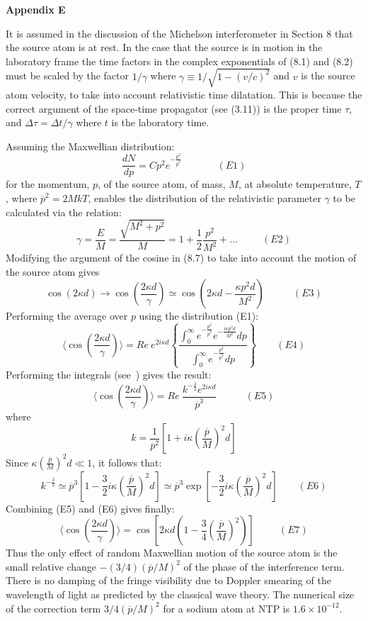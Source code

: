 { \newpage
  {\bf Appendix E}
  \par It is assumed in the discussion of the Michelson interferometer in Section 8 that the source atom
  is at rest. In the case that the source is in motion in the laboratory frame the time
   factors in the complex exponentials of (8.1) and (8.2) must be scaled by the factor $1/\gamma$
 where $\gamma \equiv 1/\sqrt{1-(v/c)^2}$ and $v$ is the source atom velocity, to take into
  account relativistic time dilatation. This is because the correct argument of the space-time
  propagator (see (3.11)) is the proper time $\tau$, and $\Delta \tau = \Delta t/\gamma$
  where $t$ is the laboratory time.
  \par Assuming the Maxwellian distribution:
  \[ \frac{dN}{dp} = Cp^2 e^{-\frac{p^2}{\overline{p}^2}} ~~~~~~~~~~~~~~~~(E1)\]
  for the momentum, $p$, of the source atom, of mass, $M$, at absolute temperature, $T$,
   where $\overline{p}^2 = 2MkT$,
   enables the distribution of the
  relativistic parameter $\gamma$ to be calculated via the relation:
  \[ \gamma = \frac{E}{M} = \frac{\sqrt{M^2+p^2}}{M} = 1+ \frac{1}{2} \frac{p^2}{M^2}+ ...~~~~~~~~~~~(E2)\]
  Modifying the argument of the cosine in
   (8.7) to take into account the motion of the source atom gives
\[ \cos(2 \kappa d) \rightarrow  \cos(\frac{2 \kappa d}{\gamma}) \simeq  \cos(2 \kappa d- \frac{\kappa p^2 d}{M^2})
   ~~~~~~~~~~~~~(E3) \]
 Performing the average over $p$ using the distribution (E1):
 \[ \langle  \cos(\frac{2 \kappa d}{\gamma}) \rangle = Re~ e^{2i \kappa d} \left\{
  \frac{\int_0^{\infty} e^{-\frac{p^2}{\overline{p}^2}}  e^{-\frac{i \kappa  p^2 d}{M^2}} dp}
    {\int_0^{\infty}  e^{-\frac{p^2}{\overline{p}^2}} dp} \right\}~~~~~~~~~(E4) \]  
 Performing the integrals (see~\cite{Jeans}) gives the result:
  \[ \langle  \cos(\frac{2 \kappa d}{\gamma}) \rangle = Re~\frac{k^{-\frac{3}{2}} e^{2 i \kappa d}}
    {\overline{p}^3}~~~~~~~~~~~~~(E5) \]
  where 
  \[ k = \frac{1}{\overline{p}^2}[1+ i \kappa\left(\frac{\overline{p}}{M}\right)^2 d] \]
  Since $\kappa\left(\frac{\overline{p}}{M}\right)^2 d \ll 1$, it follows that:
 \[ k^{-\frac{3}{2}} \simeq \overline{p}^3[1-\frac{3}{2}i \kappa\left(\frac{\overline{p}}{M}\right)^2 d]
  \simeq   \overline{p}^3 \exp\left[-\frac{3}{2}i \kappa\left(\frac{\overline{p}}{M}\right)^2 d\right]~~~~~~~~~(E6) \]
  Combining (E5) and (E6) gives finally:
 \[ \langle  \cos(\frac{2 \kappa d}{\gamma}) \rangle = \cos \left[ 2 \kappa d(1- 
  \frac{3}{4}\left(\frac{\overline{p}}{M}\right)^2)\right]~~~~~~~~~~~(E7) \]
  Thus the only effect of random Maxwellian motion of the source atom is the small relative change $-(3/4)(\overline{p}
   /M)^2$ of the phase of the interference term. There is no damping of the fringe visibility due
    to Doppler smearing of the wavelength of light as predicted by the classical wave theory.
     The numerical size of the correction term $3/4(\overline{p}/M)^2$ for a sodium atom at NTP is
     $1.6 \times 10^{-12}$.

}
